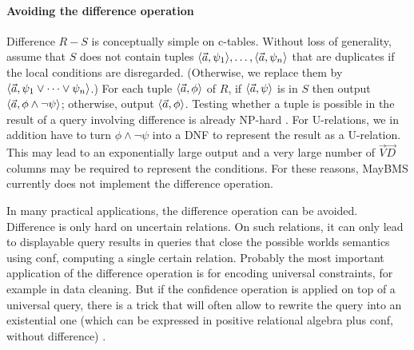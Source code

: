 


\paragraph{Avoiding the difference operation}
%
Difference $R-S$ is conceptually simple on c-tables.
Without loss of generality, assume that $S$ does not contain tuples
$\langle \vec{a}, \psi_1 \rangle, \dots, \langle \vec{a}, \psi_n \rangle$ that are duplicates if the local conditions are disregarded. (Otherwise, we replace them
by $\langle \vec{a}, \psi_1 \lor \dots \lor \psi_n \rangle$.)
For each tuple $\langle \vec{a}, \phi \rangle$ of $R$, if
$\langle \vec{a}, \psi \rangle$ is in $S$ then output
$\langle \vec{a}, \phi \land \neg \psi \rangle$; otherwise, output
$\langle \vec{a}, \phi \rangle$.
Testing whether a tuple is possible in the result of a query involving difference is already NP-hard \cite{AKG1991}. For U-relations, we in addition have to turn $\phi \land \neg \psi$
into a DNF to represent the result as a U-relation.
This may lead to an exponentially large output and a very large number of $\vec{V}\vec{D}$ columns may be required to represent the conditions.
For these reasons, MayBMS currently does not implement the difference operation.

In many practical applications, the difference operation can be avoided.
Difference is only hard on uncertain relations. On such relations, it can only lead to displayable query results in queries that close the possible worlds semantics using conf, computing a single certain relation. 
%
Probably the most important application of the difference operation is for encoding universal constraints, for example in data cleaning.
But if the confidence operation is applied on top of a universal query, there is a trick that will often allow to rewrite the query into an
existential one  (which can be expressed in positive relational algebra plus conf,
without difference) \cite{Koch2008}.



